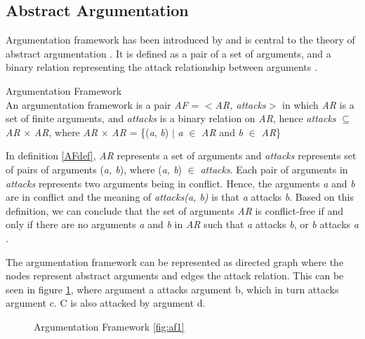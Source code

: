 \subsection{Abstract Argumentation}
Argumentation framework has been introduced by \citet{dung1995} and is central to the theory of abstract argumentation \citep{baroni2011introduction}. It is defined as a pair of a set of arguments, and a binary relation representing the attack relationship between arguments \citep{dung1995}. 

\theoremstyle{definition}
\begin{definition}{Argumentation Framework}
\label{AFdef}\\
An argumentation framework is a pair \textit{AF} = $<$\textit{AR, attacks}$>$ in which \textit{AR} is a set of finite arguments, and \textit{attacks} is a binary relation on \textit{AR}, hence \textit{attacks} $\subseteq$ \textit{AR} $\times$ \textit{AR}, where \textit{AR} $\times$ \textit{AR} = \{(\textit{a}, \textit{b}) $\vert$ \textit{a} $\in$ \textit{AR} and \textit{b} $\in$ \textit{AR}\}
\end{definition}

In definition \ref{AFdef}, \textit{AR} represents a set of arguments and \textit{attacks} represents set of pairs of arguments (\textit{a, b}), where (\textit{a, b}) $\in$ \textit{attacks}. Each pair of arguments in \textit{attacks} represents two arguments being in conflict. Hence, the arguments \textit{a} and \textit{b} are in conflict and the meaning of \textit{attacks(a, b)} is that \textit{a} attacks \textit{b}. Based on this definition, we can conclude that the set of arguments \textit{AR} is conflict-free if and only if there are no arguments \textit{a} and \textit{b} in \textit{AR} such that \textit{a} attacks \textit{b}, or \textit{b} attacks \textit{a} \citep{dung1995}.

The argumentation framework can be represented as directed graph where the nodes represent abstract arguments and edges the attack relation. This can be seen in figure \ref{fig:argumentationFrameworkFigure}, where argument a attacks argument b, which in turn attacks argument c. C is also attacked by argument d.
\newpage
\begin{figure}[h]
\centering
{}
\caption{Argumentation Framework \ref{fig:af1}}
\label{fig:argumentationFrameworkFigure}
\end{figure}
 
